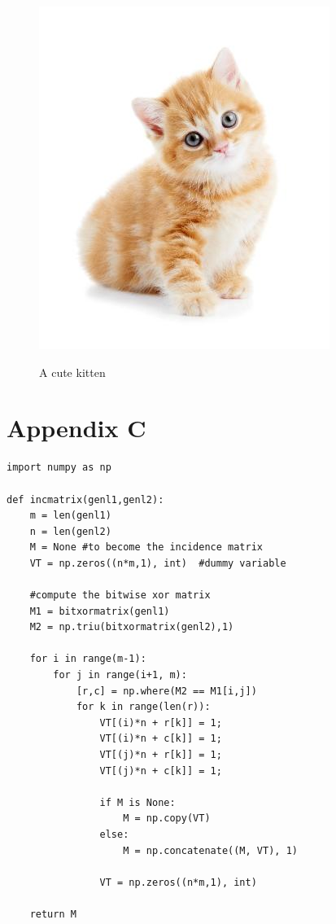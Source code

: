 \documentclass{stats_apa_style2}
\begin{document}
\begin{figure}[H]
	\caption{A cute kitten}
	\includegraphics[scale=0.5]{kitten.jpg} 
	\label{fig:gray1}
\end{figure}

\newpage

\section*{Appendix C}
\label{app: C}
\begin{lstlisting}
import numpy as np
 
def incmatrix(genl1,genl2):
    m = len(genl1)
    n = len(genl2)
    M = None #to become the incidence matrix
    VT = np.zeros((n*m,1), int)  #dummy variable
 
    #compute the bitwise xor matrix
    M1 = bitxormatrix(genl1)
    M2 = np.triu(bitxormatrix(genl2),1) 
 
    for i in range(m-1):
        for j in range(i+1, m):
            [r,c] = np.where(M2 == M1[i,j])
            for k in range(len(r)):
                VT[(i)*n + r[k]] = 1;
                VT[(i)*n + c[k]] = 1;
                VT[(j)*n + r[k]] = 1;
                VT[(j)*n + c[k]] = 1;
 
                if M is None:
                    M = np.copy(VT)
                else:
                    M = np.concatenate((M, VT), 1)
 
                VT = np.zeros((n*m,1), int)
 
    return M
\end{lstlisting}
\end{document}

